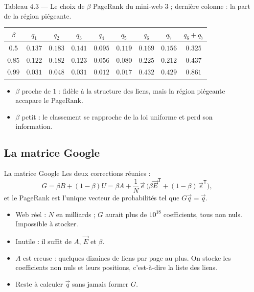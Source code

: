 \begin{frame}{Tableau 4.3 --- Le choix de $\beta$}
  \small PageRank du mini-web 3 ; dernière colonne : la part de la région
  piégeante.
  \begin{center}
  \footnotesize
  \begin{tabular}{cccccccc|c}
    \toprule
    $\beta$ & $q_1$ & $q_2$ & $q_3$ & $q_4$ & $q_5$ & $q_6$ & $q_7$ & $q_6+q_7$ \\
    \midrule
    $\num{0.5}$ & $\num{0.137}$ & $\num{0.183}$ & $\num{0.141}$ & $\num{0.095}$ & $\num{0.119}$ & $\num{0.169}$ & $\num{0.156}$ & $\num{0.325}$ \\
    $\num{0.85}$ & $\num{0.122}$ & $\num{0.182}$ & $\num{0.123}$ & $\num{0.056}$ & $\num{0.080}$ & $\num{0.225}$ & $\num{0.212}$ & $\num{0.437}$ \\
    $\num{0.99}$ & $\num{0.031}$ & $\num{0.048}$ & $\num{0.031}$ & $\num{0.012}$ & $\num{0.017}$ & $\num{0.432}$ & $\num{0.429}$ & $\num{0.861}$ \\
    \bottomrule
  \end{tabular}
  \end{center}
  \small
  \begin{itemize}
    \item $\beta$ proche de $1$ : fidèle à la structure des liens, mais la
      région piégeante accapare le PageRank.
    \item $\beta$ petit : le classement se rapproche de la loi uniforme et
      perd son information.
  \end{itemize}
\end{frame}

\subsection{La matrice Google}

\begin{frame}{La matrice Google}
  \small Les deux corrections réunies :
  \[
    G = \beta B+(1-\beta)U
    = \beta A+\frac1N\,\vec e\,\big(\beta\vec E^{\mathsf T}+(1-\beta)\,\vec e^{\mathsf T}\big),
  \]
  et le PageRank est l'unique vecteur de probabilités tel que
  $G\vec q=\vec q$.
  \begin{itemize}
    \item Web réel : $N$ en milliards ; $G$ aurait plus de $10^{18}$
      coefficients, tous non nuls. Impossible à stocker.
    \item Inutile : il suffit de $A$, $\vec E$ et $\beta$.
    \item $A$ est creuse : quelques dizaines de liens par page au plus.
      On stocke les coefficients non nuls et leurs positions, c'est-à-dire
      la liste des liens.
    \item Reste à calculer $\vec q$ sans jamais former $G$.
  \end{itemize}
\end{frame}
